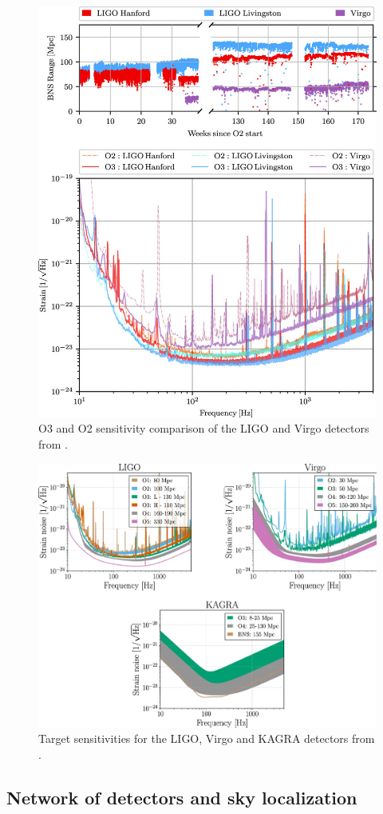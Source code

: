 \begin{figure}
  \centering
  \includegraphics[width=0.5\linewidth]{sectionDetection/sensitivity_comparison.png}
  \caption{O3 and O2 sensitivity comparison of the LIGO and Virgo detectors from \cite{ligo_characterization}.}
  \label{fig:sensitivity_comparison}
\end{figure}


\begin{figure}
  \centering
  \includegraphics[width=0.5\linewidth]{sectionDetection/design_sensitivities.png}
  \caption{Target sensitivities for the LIGO, Virgo and KAGRA detectors from \cite{prospects}.}
  \label{fig:design_sensitivities}
\end{figure}



\clearpage \newpage
\subsection{Network of detectors and sky localization}
\label{sec:network}

